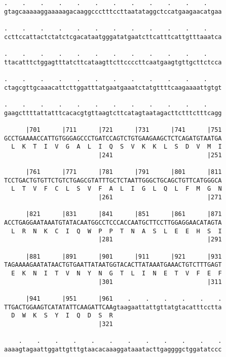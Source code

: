 \documentclass{article}
\begin{document}
\begin{Verbatim}
.    .    .    .    .    .    .    .    .    .    .    .    
gtagcaaaaaggaaaaagacaaggccctttccttaatataggctccatgaagaacatgaa
                                                            
.    .    .    .    .    .    .    .    .    .    .    .    
ccttccattactctatctcgacataatgggatatgaatcttcatttcattgtttaaatca
                                                            
.    .    .    .    .    .    .    .    .    .    .    .    
ttacatttctggagtttatcttcataagttcttccccttcaatgaagtgttgcttctcca
                                                            
.    .    .    .    .    .    .    .    .    .    .    .    
ctagcgttgcaaacattcttggatttatgaatgaaatctatgttttcaagaaaattgtgt
                                                            
.    .    .    .    .    .    .    .    .    .    .    .    
gaagcttttattatttcacacgtgttaagtcttcatagtaatagacttctttctttcagg
                                                            
      |701      |711      |721      |731      |741      |751
GCCTGAAAACCATTGTGGGAGCCCTGATCCAGTCTGTGAAGAAGCTCTCAGATGTAATGA
  L  K  T  I  V  G  A  L  I  Q  S  V  K  K  L  S  D  V  M  I
                          |241                          |251
  
      |761      |771      |781      |791      |801      |811
TCCTGACTGTGTTCTGTCTGAGCGTATTTGCTCTAATTGGGCTGCAGCTGTTCATGGGCA
  L  T  V  F  C  L  S  V  F  A  L  I  G  L  Q  L  F  M  G  N
                          |261                          |271
  
      |821      |831      |841      |851      |861      |871
ACCTGAGGAATAAATGTATACAATGGCCTCCCACCAATGCTTCCTTGGAGGAACATAGTA
  L  R  N  K  C  I  Q  W  P  P  T  N  A  S  L  E  E  H  S  I
                          |281                          |291
  
      |881      |891      |901      |911      |921      |931
TAGAAAAGAATATAACTGTGAATTATAATGGTACACTTATAAATGAAACTGTCTTTGAGT
  E  K  N  I  T  V  N  Y  N  G  T  L  I  N  E  T  V  F  E  F
                          |301                          |311
  
      |941      |951      |961    .    .    .    .    .    .
TTGACTGGAAGTCATATATTCAAGATTCAAgtaagaattattgttatgtacatttcctta
  D  W  K  S  Y  I  Q  D  S  R                              
                          |321                              
  
    .    .    .    .    .    .    .    .    .    .    .    .
aaaagtagaattggattgtttgtaacacaaaggataaatacttgaggggctggatatccc
                                                            

\end{Verbatim}
\end{document}
